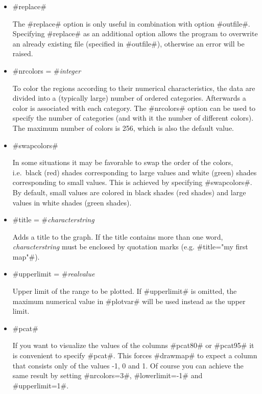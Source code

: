 \begin{itemize}
\item #replace#

The #replace# option is only useful in combination with option
#outfile#. Specifying #replace# as an additional option allows the
program to overwrite an already existing file (specified in
#outfile#), otherwise an error will be raised.

\item #nrcolors = #{\em integer}

To color the regions according to their numerical characteristics,
the data are divided into a (typically large) number of ordered
categories. Afterwards a color is associated with each category.
The #nrcolors# option can be used to specify the number of
categories (and with it the number of different colors). The
maximum number of colors is 256, which is also the default value.

\item #swapcolors#

In some situations it may be favorable to swap the order of the
colors, i.e.~black (red) shades corresponding to large values and
white (green) shades corresponding to small values. This is
achieved by specifying #swapcolors#. By default, small values are
colored in black shades (red shades) and large values in white
shades (green shades).

\item #title = #{\em characterstring}

Adds a title to the graph. If the title contains more than one
word, {\em characterstring} must be enclosed by quotation marks
(e.g. #title="my first map"#).

\item #upperlimit = #{\em realvalue}

Upper limit of the range to be plotted. If #upperlimit# is
omitted, the maximum numerical value in #plotvar# will be used
instead as the upper limit.

\item #pcat#

If you want to visualize the values of the columns #pcat80# or
#pcat95# it is convenient to specify #pcat#. This forces #drawmap#
to expect a column that consists only of the values -1, 0 and 1.
Of course you can achieve the same result by setting #nrcolors=3#,
#lowerlimit=-1# and #upperlimit=1#.
\end{itemize}


